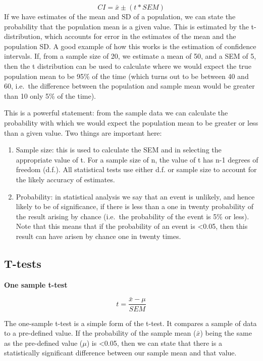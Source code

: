 \documentclass[
]{book}
\begin{document}
\[
CI =\bar{x} ± (t * SEM)
\]
If we have estimates of the mean and SD of a population, we can state the probability that the population mean is a given value. This is estimated by the t-distribution, which accounts for error in the estimates of the mean and the population SD. A good example of how this works is the estimation of confidence intervals. If, from a sample size of 20, we estimate a mean of 50, and a SEM of 5, then the t distribution can be used to calculate where we would expect the true population mean to be 95\% of the time (which turns out to be between 40 and 60, i.e.~the difference between the population and sample mean would be greater than 10 only 5\% of the time).

This is a powerful statement: from the sample data we can calculate the probability with which we would expect the population mean to be greater or less than a given value. Two things are important here:

\begin{enumerate}
\def\labelenumi{\arabic{enumi})}
\item
  Sample size: this is used to calculate the SEM and in selecting the appropriate value of t. For a sample size of n, the value of t has n-1 degrees of freedom (d.f.). All statistical tests use either d.f. or sample size to account for the likely accuracy of estimates.
\item
  Probability: in statistical analysis we say that an event is unlikely, and hence likely to be of significance, if there is less than a one in twenty probability of the result arising by chance (i.e.~the probability of the event is 5\% or less). Note that this means that if the probability of an event is \textless0.05, then this result can have arisen by chance one in twenty times.
\end{enumerate}

\subsection*{T-tests}\label{t-tests}

\textbf{One sample t-test}

\[
t = \frac{\bar x - \mu}{SEM}
\]

The one-sample t-test is a simple form of the t-test. It compares a sample of data to a pre-defined value. If the probability of the sample mean (\(\bar{x}\)) being the same as the pre-defined value (\(\mu\)) is \textless0.05, then we can state that there is a statistically significant difference between our sample mean and that value.
\end{document}
